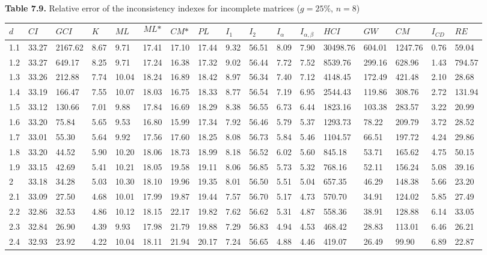 \newpage
\textbf{Table 7.9.} Relative error of the inconsistency indexes for incomplete matrices ($g=25\%$, $n=8$)
\begin{adjustbox}{angle=90}
  \begin{center}
    \begin{tabular}{|l|llllllllllllllll|}
      \hline $d$ &
$\textit{CI}$&$\textit{GCI}$&$K$&$\textit{ML}$&$$\textit{ML*}$$&$\textit{CM*}$&$\textit{PL}$&$\textit{I}_1$&$\textit{I}_2$&$\textit{I}_{\alpha}$&$\textit{I}_{\alpha,\beta}$&$\textit{HCI}$&$\textit{GW}$&$\textit{CM}$&$\textit{I}_{CD}$&$\textit{RE}$\\ \hline \hline
1.1&33.27&2167.62&8.67&9.71&17.41&17.10&17.44&9.32&56.51&8.09&7.90&30498.76&604.01&1247.76&0.76&59.04  \\ 
1.2&33.27&649.17&8.25&9.71&17.24&16.38&17.32&9.02&56.44&7.72&7.52&8539.76&299.16&628.96&1.43&794.57  \\ 
1.3&33.26&212.88&7.74&10.04&18.24&16.89&18.42&8.97&56.34&7.40&7.12&4148.45&172.49&421.48&2.10&28.68  \\ 
1.4&33.19&166.47&7.55&10.07&18.03&16.75&18.33&8.77&56.54&7.19&6.95&2544.43&119.86&308.76&2.72&131.94  \\ 
1.5&33.12&130.66&7.01&9.88&17.84&16.69&18.29&8.38&56.55&6.73&6.44&1823.16&103.38&283.57&3.22&20.99  \\ 
1.6&33.20&75.84&5.65&9.53&16.80&15.99&17.34&7.92&56.46&5.79&5.37&1293.73&78.22&209.79&3.72&28.52  \\ 
1.7&33.01&55.30&5.64&9.92&17.56&17.60&18.25&8.08&56.73&5.84&5.46&1104.57&66.51&197.72&4.24&29.86  \\ 
1.8&33.20&44.52&5.90&10.20&18.06&18.73&18.99&8.18&56.52&6.02&5.60&845.18&53.71&165.62&4.75&50.15  \\ 
1.9&33.15&42.69&5.41&10.21&18.05&19.58&19.11&8.06&56.85&5.73&5.32&768.16&52.11&156.24&5.08&39.16  \\ 
2&33.18&34.28&5.03&10.30&18.10&19.96&19.35&8.01&56.50&5.51&5.04&657.35&46.29&148.38&5.66&23.20  \\ 
2.1&33.09&27.50&4.68&10.01&17.99&19.87&19.44&7.57&56.70&5.17&4.73&570.70&34.91&124.02&5.85&27.49  \\ 
2.2&32.86&32.53&4.86&10.12&18.15&22.17&19.82&7.62&56.62&5.31&4.87&558.36&38.91&128.88&6.14&33.05  \\ 
2.3&32.84&26.90&4.39&9.93&17.98&21.79&19.88&7.29&56.83&4.94&4.53&468.42&28.83&113.01&6.46&26.21  \\ 
2.4&32.93&23.92&4.22&10.04&18.11&21.94&20.17&7.24&56.65&4.88&4.46&419.07&26.49&99.90&6.89&22.87  \\ 

\end{tabular}
\end{center}
\end{adjustbox}

